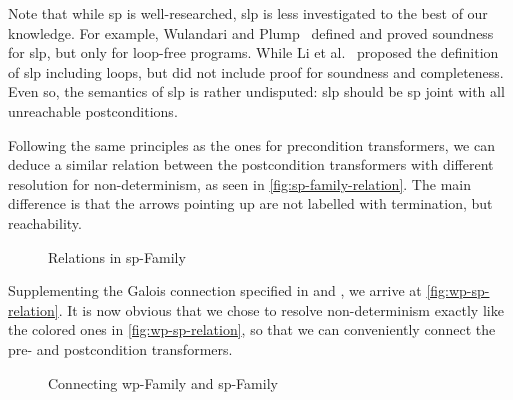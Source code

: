 Note that while sp is well-researched, slp is less investigated to the best of our knowledge. 
For example, Wulandari and Plump~\cite{wulandari2020VerifyingGraphPrograms} defined and proved soundness for slp, but only for loop-free programs. 
While Li et al.~\cite{li2011NonlinearMathematicsUncertainty} proposed the definition of slp including loops, but did not include proof for soundness and completeness. 
Even so, the semantics of slp is rather undisputed: slp should be sp joint with all unreachable postconditions. 

Following the same principles as the ones for precondition transformers, we can deduce a similar relation between the postcondition transformers with different resolution for non-determinism, as seen in \autoref{fig:sp-family-relation}. 
The main difference is that the arrows pointing up are not labelled with termination, but reachability. 

\begin{figure}[ht]
	\centering
	
	\caption{Relations in sp-Family}
	\label{fig:sp-family-relation}
\end{figure}

Supplementing the Galois connection specified in  and , we arrive at \autoref{fig:wp-sp-relation}. 
It is now obvious that we chose to resolve non-determinism exactly like the colored ones in \autoref{fig:wp-sp-relation}, so that we can conveniently connect the pre- and postcondition transformers. 

\begin{figure}[ht]
	\centering
	
	\caption{Connecting wp-Family and sp-Family}
	\label{fig:wp-sp-relation}
\end{figure}

